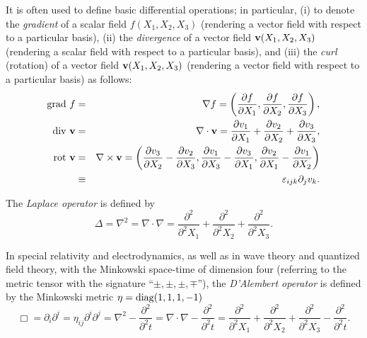 It is often used to define basic differential operations;
in particular, (i) to denote the {\em gradient} of a scalar field $f(X_1,X_2,X_3)$ (rendering a vector field with respect to a particular basis),
(ii) the {\em divergence} of a vector field ${\bf v}(X_1,X_2,X_3)$
(rendering a scalar field with respect to a particular basis), and
(iii) the {\em curl} (rotation) of a vector field  ${\bf v}(X_1,X_2,X_3)$ (rendering a vector field with respect to a particular basis)
as follows:
\begin{eqnarray}
\textrm{grad } f &=& \nabla f = \left(
\frac{\partial f}{\partial X_1},
\frac{\partial f}{\partial X_2},
\frac{\partial f}{\partial X_3}
\right)  ,\\
\textrm{div }  {\bf v} &=& \nabla \cdot {\bf v} =
\frac{\partial v_1}{\partial X_1}+
\frac{\partial v_2}{\partial X_2}+
\frac{\partial v_3}{\partial X_3}
  ,\\
\textrm{rot } {\bf v} &=& \nabla \times {\bf v} = \left(
\frac{\partial v_3}{\partial X_2}-
\frac{\partial v_2}{\partial X_3}
,
\frac{\partial v_1}{\partial X_3}-
\frac{\partial v_3}{\partial X_1}
,
\frac{\partial v_2}{\partial X_1}-
\frac{\partial v_1}{\partial X_2}
\right)          \\
&\equiv& \varepsilon_{ijk} \partial_j v_k.
\end{eqnarray}

The {\em Laplace operator}
is defined by
\begin{equation}
\Delta = \nabla^2= \nabla \cdot \nabla =
\frac{\partial^2 }{\partial^2 X_1}+
\frac{\partial^2 }{\partial^2 X_2}+
\frac{\partial^2 }{\partial^2 X_3}
.
\end{equation}

In special relativity and electrodynamics,  as well as in  wave theory and quantized field theory, with the Minkowski space-time
of dimension four
(referring to the metric tensor with the signature ``$\pm ,\pm ,\pm ,\mp$''),
the {\em D'Alembert operator}
is defined by the Minkowski metric $\eta = {\rm diag} (1,1,1,-1)$
\begin{equation}
\Box  = \partial_i \partial^i
=
\eta_{ij}  \partial^i \partial^j=
\nabla^2- \frac{\partial^2 }{\partial^2 t}=
\nabla \cdot \nabla - \frac{\partial^2 }{\partial^2 t}=
\frac{\partial^2 }{\partial^2 X_1}+
\frac{\partial^2 }{\partial^2 X_2}+
\frac{\partial^2 }{\partial^2 X_3}- \frac{\partial^2 }{\partial^2 t}
.
\end{equation}



